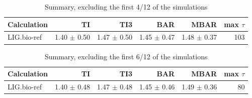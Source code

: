 \documentclass[journal=jctcce,manuscript=article,hyperref=false]{achemso}
\begin{document}
\begin{table}
\caption{Summary, excluding the first 4/12 of the simulations}
{\small
\begin{tabular}{l r r r r r}
\hline
                             Calculation &                 TI &                TI3 &                BAR &               MBAR & max $\tau$\\
\hline                             LIG.bio-ref &    1.40 $\pm$    0.50 &    1.47 $\pm$    0.50 &    1.45 $\pm$    0.47 &    1.48 $\pm$    0.37 &     103 \\

\hline
\end{tabular}
}
\end{table}

\begin{table}
\caption{Summary, excluding the first 6/12 of the simulations}
{\small
\begin{tabular}{l r r r r r}
\hline
                             Calculation &                 TI &                TI3 &                BAR &               MBAR & max $\tau$\\
\hline                             LIG.bio-ref &    1.40 $\pm$    0.48 &    1.47 $\pm$    0.48 &    1.45 $\pm$    0.46 &    1.49 $\pm$    0.36 &      80 \\

\hline
\end{tabular}
}
\end{table}
\end{document}
